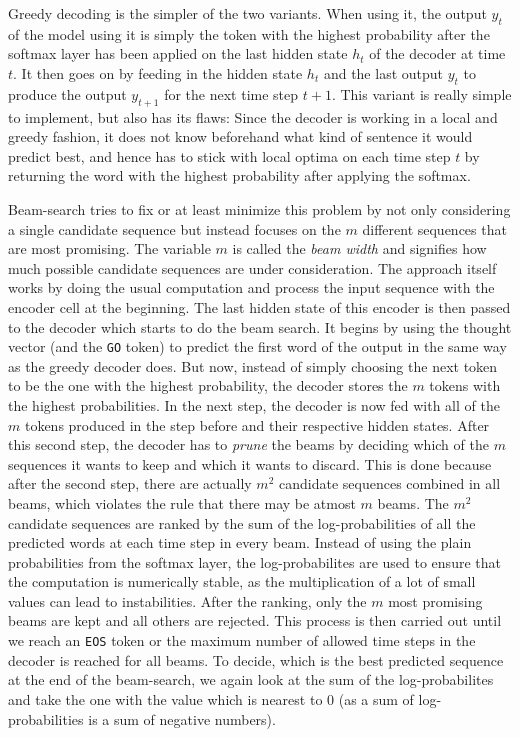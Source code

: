 Greedy decoding is the simpler of the two variants. When using it, the output $y_t$ of the model using it is simply the token with the highest probability after the softmax layer has been applied on the last hidden state $h_t$ of the decoder at time $t$. It then goes on by feeding in the hidden state $h_t$ and the last output $y_t$ to produce the output $y_{t+1}$ for the next time step $t+1$. This variant is really simple to implement, but also has its flaws: Since the decoder is working in a local and greedy fashion, it does not know beforehand what kind of sentence it would predict best, and hence has to stick with local optima on each time step $t$ by returning the word with the highest probability after applying the softmax.

Beam-search tries to fix or at least minimize this problem by not only considering a single candidate sequence but instead focuses on the $m$ different sequences that are most promising. The variable $m$ is called the \emph{beam width} and signifies how much possible candidate sequences are under consideration. The approach itself works by doing the usual computation and process the input sequence with the encoder cell at the beginning. The last hidden state of this encoder is then passed to the decoder which starts to do the beam search. It begins by using the thought vector (and the \texttt{GO} token) to predict the first word of the output in the same way as the greedy decoder does. But now, instead of simply choosing the next token to be the one with the highest probability, the decoder stores the $m$ tokens with the highest probabilities. In the next step, the decoder is now fed with all of the $m$ tokens produced in the step before and their respective hidden states. After this second step, the decoder has to \emph{prune} the beams by deciding which of the $m$ sequences it wants to keep and which it wants to discard. This is done because after the second step, there are actually $m^2$ candidate sequences combined in all beams, which violates the rule that there may be atmost $m$ beams. The $m^2$ candidate sequences are ranked by the sum of the log-probabilities of all the predicted words at each time step in every beam. Instead of using the plain probabilities from the softmax layer, the log-probabilites are used to ensure that the computation is numerically stable, as the multiplication of a lot of small values can lead to instabilities. After the ranking, only the $m$ most promising beams are kept and all others are rejected. This process is then carried out until we reach an \texttt{EOS} token or the maximum number of allowed time steps in the decoder is reached for all beams. To decide, which is the best predicted sequence at the end of the beam-search, we again look at the sum of the log-probabilites and take the one with the value which is nearest to $0$ (as a sum of log-probabilities is a sum of negative numbers).

